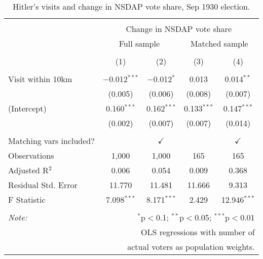
\begin{table}[!htbp] \centering 
  \caption{Hitler's visits and change in NSDAP vote share, Sep 1930 election.} 
  \label{tab:ols-d_p_nsdap-1} 
\begin{tabular}{@{\extracolsep{5pt}}lcccc} 
\\[-1.8ex]\hline 
\hline \\[-1.8ex] 
 & \multicolumn{4}{c}{Change in NSDAP vote share} \\ 
\cline{2-5} 
 & \multicolumn{2}{c}{Full sample} & \multicolumn{2}{c}{Matched sample} \\ 
\\[-1.8ex] & (1) & (2) & (3) & (4)\\ 
\hline \\[-1.8ex] 
 Visit within 10km & $-$0.012$^{***}$ & $-$0.012$^{*}$ & 0.013 & 0.014$^{**}$ \\ 
  & (0.005) & (0.006) & (0.008) & (0.007) \\ 
  (Intercept) & 0.160$^{***}$ & 0.162$^{***}$ & 0.133$^{***}$ & 0.147$^{***}$ \\ 
  & (0.002) & (0.007) & (0.007) & (0.014) \\ 
 \hline \\[-1.8ex] 
Matching vars included? &  & \multicolumn{1}{c}{$\checkmark$} &  & \multicolumn{1}{c}{$\checkmark$} \\ 
Observations & 1,000 & 1,000 & 165 & 165 \\ 
Adjusted R$^{2}$ & 0.006 & 0.054 & 0.009 & 0.368 \\ 
Residual Std. Error & 11.770 & 11.481 & 11.666 & 9.313 \\ 
F Statistic & 7.098$^{***}$ & 8.171$^{***}$ & 2.429 & 12.946$^{***}$ \\ 
\hline 
\hline \\[-1.8ex] 
\textit{Note:}  & \multicolumn{4}{r}{$^{*}$p$<$0.1; $^{**}$p$<$0.05; $^{***}$p$<$0.01} \\ 
 & \multicolumn{4}{r}{OLS regressions with number of} \\ 
 & \multicolumn{4}{r}{actual voters as population weights.} \\ 
\end{tabular} 
\end{table} 
